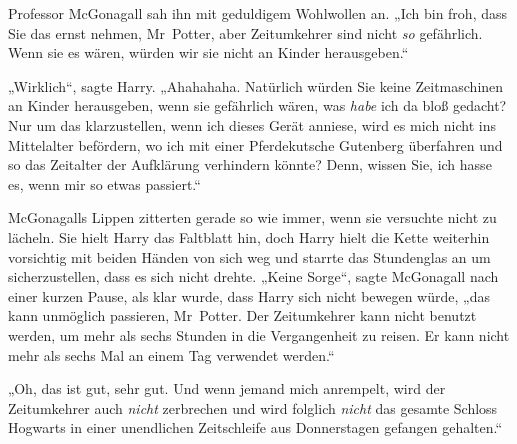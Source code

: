 Professor McGonagall sah ihn mit geduldigem Wohlwollen an. „Ich bin froh, dass Sie das ernst nehmen, Mr~Potter, aber Zeitumkehrer sind nicht \emph{so} gefährlich. Wenn sie es wären, würden wir sie nicht an Kinder herausgeben.“

„Wirklich“, sagte Harry. „Ahahahaha. Natürlich würden Sie keine Zeitmaschinen an Kinder herausgeben, wenn sie gefährlich wären, was \emph{habe} ich da bloß gedacht? Nur um das klarzustellen, wenn ich dieses Gerät anniese, wird es mich nicht ins Mittelalter befördern, wo ich mit einer Pferdekutsche Gutenberg überfahren und so das Zeitalter der Aufklärung verhindern könnte? Denn, wissen Sie, ich hasse es, wenn mir so etwas passiert.“

McGonagalls Lippen zitterten gerade so wie immer, wenn sie versuchte nicht zu lächeln. Sie hielt Harry das Faltblatt hin, doch Harry hielt die Kette weiterhin vorsichtig mit beiden Händen von sich weg und starrte das Stundenglas an um sicherzustellen, dass es sich nicht drehte. „Keine Sorge“, sagte McGonagall nach einer kurzen Pause, als klar wurde, dass Harry sich nicht bewegen würde, „das kann unmöglich passieren, Mr~Potter. Der Zeitumkehrer kann nicht benutzt werden, um mehr als sechs Stunden in die Vergangenheit zu reisen. Er kann nicht mehr als sechs Mal an einem Tag verwendet werden.“

„Oh, das ist gut, sehr gut. Und wenn jemand mich anrempelt, wird der Zeitumkehrer auch \emph{nicht} zerbrechen und wird folglich \emph{nicht} das gesamte Schloss Hogwarts in einer unendlichen Zeitschleife aus Donnerstagen gefangen gehalten.“

